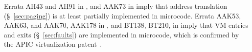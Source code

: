
Errata AH43 and AH91 in \cite{intel2010errata}, and AAK73 in
\cite{intel2015errata} imply that address translation (\S~\ref{sec:paging}) is
at least partially implemented in microcode. Errata AAK53, AAK63, and AAK70,
AAK178 in \cite{intel2015errata}, and BT138, BT210,  in \cite{intel2015errata2}
imply that VM entries and exits (\S~\ref{sec:faults}) are implemented in
microcode, which is confirmed by the APIC virtualization patent
\cite{intel2014vapic}.
